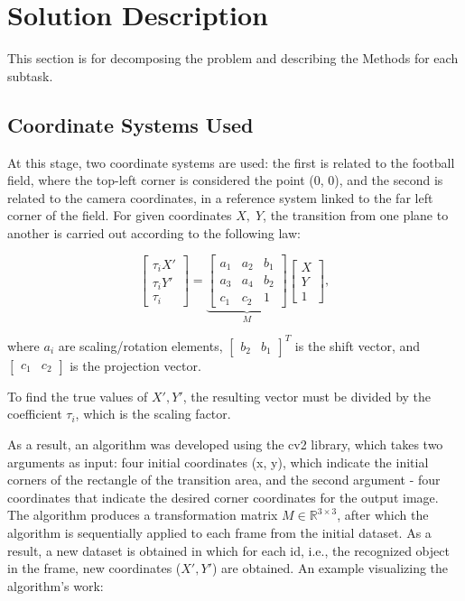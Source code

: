 \chapter{Solution Description}
 {\color{red} This section is for decomposing the problem and describing the Methods for each subtask. }

 \section{Coordinate Systems Used}\label{41}
At this stage, two coordinate systems are used: the first is related to the football field, where the top-left corner is considered the point (0, 0), and the second is related to the camera coordinates, in a reference system linked to the far left corner of the field. For given coordinates $X,\;Y$, the transition from one plane to another is carried out according to the following law:

$$
\begin{bmatrix}
\tau_{i}X' \\
\tau_{i}Y' \\
\tau_{i}
\end{bmatrix} = 
\underbrace{ \begin{bmatrix}
a_{1} & a_{2} & b_{1} \\
a_{3} & a_{4} & b_{2} \\
c_{1} & c_{2} & 1
\end{bmatrix} }_{ M } \begin{bmatrix}
X \\
Y \\
1
\end{bmatrix},
$$

where $a_i$ are scaling/rotation elements, $\begin{bmatrix}
    b_2 & b_1
\end{bmatrix}^T$ is the shift vector, and $\begin{bmatrix}
    c_1 & c_2
\end{bmatrix}$ is the projection vector.

To find the true values of $X', Y'$, the resulting vector must be divided by the coefficient $\tau_i$, which is the scaling factor.

As a result, an algorithm was developed using the cv2 library, which takes two arguments as input: four initial coordinates (x, y), which indicate the initial corners of the rectangle of the transition area, and the second argument - four coordinates that indicate the desired corner coordinates for the output image. The algorithm produces a transformation matrix $M \in \mathbb{R}^{3 \times 3}$, after which the algorithm is sequentially applied to each frame from the initial dataset. As a result, a new dataset is obtained in which for each id, i.e., the recognized object in the frame, new coordinates ($X', Y'$) are obtained. An example visualizing the algorithm's work:


